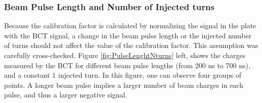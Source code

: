 \subsubsection{Beam Pulse Length and Number of Injected turns}
\label{sec:H0Hmdep}

Because the calibration factor is calculated by normalizing the signal in the plate with the BCT signal, a change in the beam pulse length or the injected number of turns should not affect the value of the calibration factor.  This assumption was carefully cross-checked. Figure \ref{fig:PulseLenghtNturns} left, shows the charges measured by the BCT for different beam pulse lengths (from 200 ns to 700 ns), and a constant 1 injected turn. In this figure, one can observe four groups of points. A longer beam pulse implies a larger number of beam charges in each pulse, and thus a larger negative signal. 

